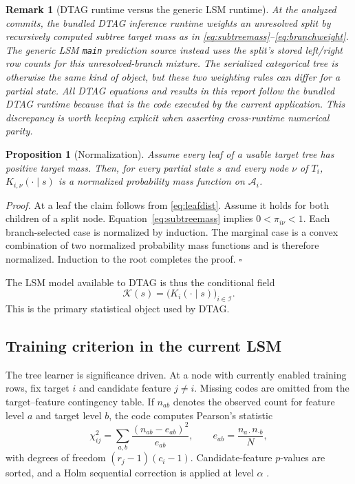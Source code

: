 \documentclass[journal]{IEEEtran}
\newtheorem{proposition}{Proposition}
\newtheorem{remark}{Remark}
\newcommand{\A}{\mathcal{A}}
\newcommand{\K}{\mathcal{K}}
\newcommand{\1}{\mathbf{1}}
\begin{document}
\begin{remark}[DTAG runtime versus the generic LSM runtime]
At the analyzed commits, the bundled DTAG inference runtime weights an unresolved split by recursively computed subtree target mass as in \eqref{eq:subtreemass}--\eqref{eq:branchweight}. The generic LSM \texttt{main} prediction source instead uses the split's stored left/right row counts for this unresolved-branch mixture. The serialized categorical tree is otherwise the same kind of object, but these two weighting rules can differ for a partial state. All DTAG equations and results in this report follow the bundled DTAG runtime because that is the code executed by the current application. This discrepancy is worth keeping explicit when asserting cross-runtime numerical parity.
\end{remark}

\begin{proposition}[Normalization]
\label{prop:normalization}
Assume every leaf of a usable target tree has positive target mass. Then, for every partial state $s$ and every node $\nu$ of $T_i$, $K_{i,\nu}(\cdot\mid s)$ is a normalized probability mass function on $\A_i$.
\end{proposition}

\emph{Proof.} At a leaf the claim follows from \eqref{eq:leafdist}. Assume it holds for both children of a split node. Equation~\eqref{eq:subtreemass} implies $0<\pi_{i\nu}<1$. Each branch-selected case is normalized by induction. The marginal case is a convex combination of two normalized probability mass functions and is therefore normalized. Induction to the root completes the proof. $\square$

The LSM model available to DTAG is thus the conditional field
\begin{equation}
  \K(s)=\big(K_i(\cdot\mid s)\big)_{i\in\mathcal{I}}.
  \label{eq:conditionalfield}
\end{equation}
This is the primary statistical object used by DTAG.

\subsection{Training criterion in the current LSM}
\label{sec:training}

The tree learner is significance driven. At a node with currently enabled training rows, fix target $i$ and candidate feature $j\neq i$. Missing codes are omitted from the target--feature contingency table. If $n_{ab}$ denotes the observed count for feature level $a$ and target level $b$, the code computes Pearson's statistic \cite{pearson1900criterion}
\begin{equation}
  \chi^2_{ij}=\sum_{a,b}\frac{(n_{ab}-e_{ab})^2}{e_{ab}},
  \qquad
  e_{ab}=\frac{n_{a\cdot}n_{\cdot b}}{N},
  \label{eq:chisq}
\end{equation}
with degrees of freedom $(r_j-1)(c_i-1)$. Candidate-feature $p$-values are sorted, and a Holm sequential correction is applied at level $\alpha$ \cite{holm1979sequential}.
\end{document}
